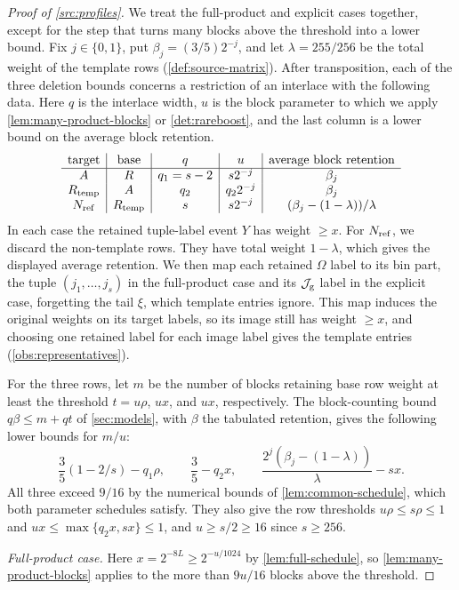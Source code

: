 \documentclass[11pt,letterpaper]{article} \usepackage[utf8]{inputenc}
\theoremstyle{plain} \newtheorem{theorem}{Theorem}[section]
\theoremstyle{definition} \newaliascnt{definition}{theorem}
\begin{document}
\begin{proof}[Proof of \cref{src:profiles}]
\label{proof:src:profiles}
We treat the full-product and explicit cases together, except for the step that turns many blocks
above the threshold into a lower bound. Fix $j\in\{0,1\}$, put
$\beta_j=(3/5)2^{-j}$, and let $\lambda=255/256$ be the total weight of the
template rows (\cref{def:source-matrix}). After transposition, each of the three deletion
bounds concerns a restriction of an interlace with the following data. Here $q$ is the interlace
width, $u$ is the block parameter to which we apply
\cref{lem:many-product-blocks} or \cref{det:rareboost}, and the last column is
a lower bound on the average block retention.
\[
\begin{array}{c|c|c|c|c}
\text{target}&\text{base}&q&u&\text{average block retention}\\ \hline
A&R&q_1=s-2&s2^{-j}&\beta_j\\
R_{\rm temp}&A&q_2&q_2 2^{-j}&\beta_j\\
N_{\rm ref}&R_{\rm temp}&s&s2^{-j}&(\beta_j-(1-\lambda))/\lambda
\end{array}
\]
In each case the retained tuple-label event $Y$ has weight $\ge x$. For
$N_{\rm ref}$, we discard the non-template rows. They have total weight
$1-\lambda$, which gives the displayed average retention. We then map each retained $\Omega$
label to its bin part, the tuple $(j_1,\ldots,j_s)$ in the full-product case
and its $\mathcal J_{\rm g}$ label in the explicit case, forgetting the tail
$\xi$, which template entries ignore. This map induces the original
weights on its target labels, so its image still has weight $\ge x$, and choosing one retained
label for each image label gives the template entries (\cref{obs:representatives}).

For the three rows, let $m$ be the number of blocks retaining base row weight at least the
threshold $t=u\rho$, $ux$, and $ux$, respectively. The block-counting bound
$q\beta\le m+qt$ of \cref{sec:models}, with $\beta$ the tabulated retention, gives the following lower bounds for $m/u$:
\[
\frac35(1-2/s)-q_1\rho,\qquad
\frac35-q_2x,\qquad
\frac{2^j(\beta_j-(1-\lambda))}{\lambda}-sx.
\]
All three exceed $9/16$ by the numerical bounds of \cref{lem:common-schedule}, which
both parameter schedules satisfy. They also give the row thresholds
$u\rho\le s\rho\le1$ and $ux\le\max\{q_2x,sx\}\le1$, and $u\ge s/2\ge16$
since $s\ge256$.

\emph{Full-product case.} Here $x=2^{-8L}\ge2^{-u/1024}$ by
\cref{lem:full-schedule}, so \cref{lem:many-product-blocks} applies to the
more than $9u/16$ blocks above the threshold.


\end{proof}
\end{document}
